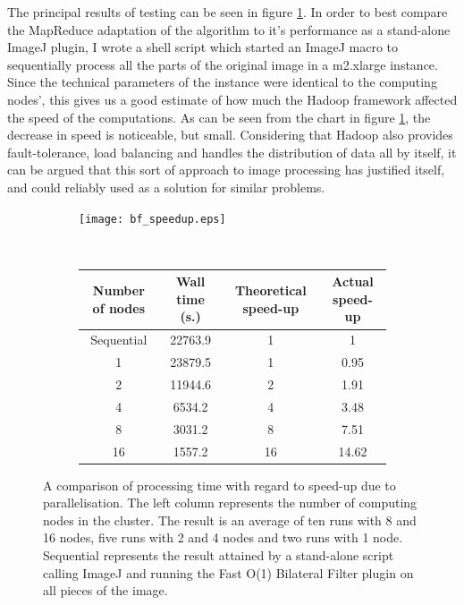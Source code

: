 \documentclass [12pt,a4paper]{report}
\begin{document}
The principal results of testing can be seen in figure \ref{bf_speedup}. In order to best compare the MapReduce adaptation of the algorithm to it's performance as a stand-alone ImageJ plugin, I wrote a shell script which started an ImageJ macro to sequentially process all the parts of the original image in a m2.xlarge instance. Since the technical parameters of the instance were identical to the computing nodes', this gives us a good estimate of how much the Hadoop framework affected the speed of the computations. As can be seen from the chart in figure \ref{bf_speedup}, the decrease in speed is noticeable, but small. Considering that Hadoop also provides fault-tolerance, load balancing and handles the distribution of data all by itself, it can be argued that this sort of approach to image processing has justified itself, and could reliably used as a solution for similar problems.

\begin{figure}[h]
\begin{subfigure}{.5\textwidth}
  \centering
  \texttt{[image: bf\_speedup.eps]} %
\end{subfigure}
%
\\
\begin{subfigure}{.5\textwidth}
\begin{center}
	\begin{tabular}{c | c | c | c}
	Number of nodes & Wall time (s.) & Theoretical speed-up & Actual speed-up \\ 
	\hline
	Sequential & 22763.9 & 1 & 1 \\
	1 & 23879.5 & 1 & 0.95 \\
	2 & 11944.6 & 2 & 1.91 \\
	4 & 6534.2 & 4 & 3.48 \\
	8 & 3031.2 & 8 & 7.51 \\
	16 & 1557.2 & 16 & 14.62 \\
	\end{tabular}
\end{center}
\end{subfigure}
\caption[A comparison of processing time with regard to speed-up]{A comparison of processing time with regard to speed-up due to parallelisation. The left column represents the number of computing nodes in the cluster. The result is an average of ten runs with 8 and 16 nodes, five runs with 2 and 4 nodes and two runs with 1 node. Sequential represents the result attained by a stand-alone script calling ImageJ and running the Fast O(1) Bilateral Filter plugin on all pieces of the image.}
\label{bf_speedup}
\end{figure}
\end{document}
